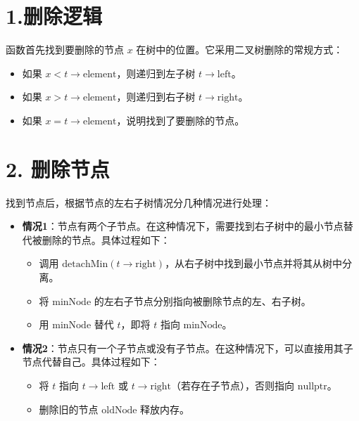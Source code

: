 \documentclass[UTF8]{ctexart}
\begin{document}
\section*{1.删除逻辑} 
函数首先找到要删除的节点 $x$ 在树中的位置。它采用二叉树删除的常规方式：
\begin{itemize}
    \item 如果 $x < t \rightarrow \text{element}$，则递归到左子树 $t \rightarrow \text{left}$。
    \item 如果 $x > t \rightarrow \text{element}$，则递归到右子树 $t \rightarrow \text{right}$。
    \item 如果 $x = t \rightarrow \text{element}$，说明找到了要删除的节点。
\end{itemize}

\section*{2. 删除节点}
找到节点后，根据节点的左右子树情况分几种情况进行处理：
\begin{itemize}
    \item \textbf{情况1}：节点有两个子节点。在这种情况下，需要找到右子树中的最小节点替代被删除的节点。具体过程如下：
    \begin{itemize}
        \item 调用 $\text{detachMin}(t \rightarrow \text{right})$，从右子树中找到最小节点并将其从树中分离。
        \item 将 $\text{minNode}$ 的左右子节点分别指向被删除节点的左、右子树。
        \item 用 $\text{minNode}$ 替代 $t$，即将 $t$ 指向 $\text{minNode}$。
    \end{itemize}
    
    \item \textbf{情况2}：节点只有一个子节点或没有子节点。在这种情况下，可以直接用其子节点代替自己。具体过程如下：
    \begin{itemize}
        \item 将 $t$ 指向 $t \rightarrow \text{left}$ 或 $t \rightarrow \text{right}$（若存在子节点），否则指向 $\text{nullptr}$。
        \item 删除旧的节点 $\text{oldNode}$ 释放内存。

    \end{itemize}
\end{itemize}
\end{document}

